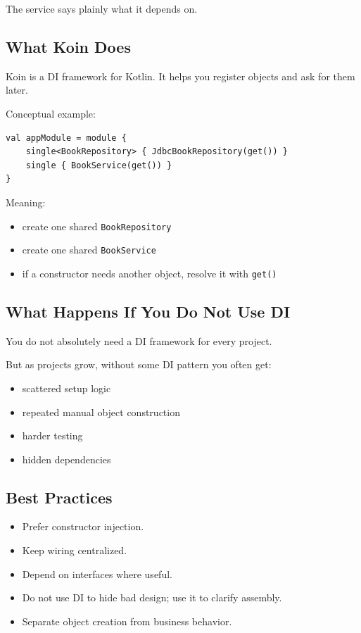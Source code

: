 \documentclass[11pt,a4paper]{article}
\begin{document}
The service says plainly what it depends on.

\subsection{What Koin Does}

Koin is a DI framework for Kotlin. It helps you register objects and ask for them later.

Conceptual example:

\begin{lstlisting}[style=kazekotlin]
val appModule = module {
    single<BookRepository> { JdbcBookRepository(get()) }
    single { BookService(get()) }
}
\end{lstlisting}

Meaning:
\begin{itemize}
    \item create one shared \texttt{BookRepository}
    \item create one shared \texttt{BookService}
    \item if a constructor needs another object, resolve it with \texttt{get()}
\end{itemize}

\subsection{What Happens If You Do Not Use DI}

You do not absolutely need a DI framework for every project.

But as projects grow, without some DI pattern you often get:
\begin{itemize}
    \item scattered setup logic
    \item repeated manual object construction
    \item harder testing
    \item hidden dependencies
\end{itemize}

\subsection{Best Practices}

\begin{itemize}
    \item Prefer constructor injection.
    \item Keep wiring centralized.
    \item Depend on interfaces where useful.
    \item Do not use DI to hide bad design; use it to clarify assembly.
    \item Separate object creation from business behavior.
\end{itemize}
\end{document}
